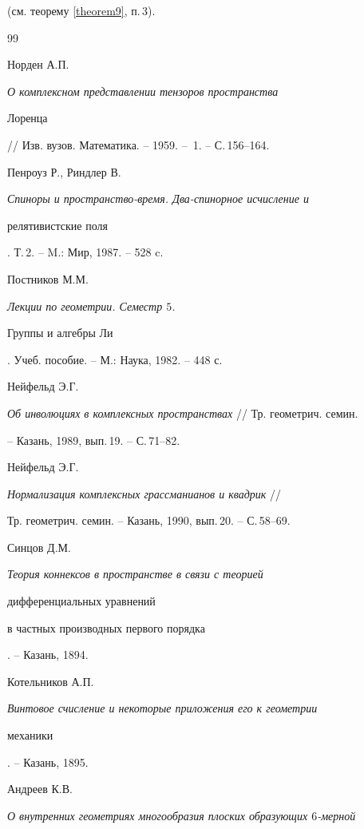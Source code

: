 (см. теорему \ref{theorem9}, п.\,3).





\begin{thebibliography}{99}







Норден А.П. {\em О комплексном представлении тензоров пространства


Лоренца} // Изв. вузов. Математика. -- 1959. -- \No\,1. -- С.\,156--164.




Пенроуз Р., Риндлер В.


{\em Спиноры и пространство-время. Два-спинорное исчисление и


релятивистские поля}. Т.\,2. -- M.: Мир, 1987. -- 528 c.




Постников М.М. {\em Лекции по геометрии. Семестр $5$.


Группы и алгебры Ли}. Учеб. пособие. -- М.: Наука, 1982. -- 448 с.




Нейфельд Э.Г.


{\em Об инволюциях в комплексных пространствах} // Тр. геометрич. семин.


-- Казань, 1989, вып.\,19. -- С.\,71--82.




Нейфельд Э.Г.


{\em Нормализация комплексных грассманианов и квадрик} //


Тр. геометрич. семин. -- Казань, 1990, вып.\,20. -- С.\,58--69.




Синцов Д.М. {\em Теория коннексов в пространстве в связи с теорией 


дифференциальных уравнений


в частных производных первого порядка}. -- Казань, 1894.




Котельников А.П.


{\em Винтовое счисление и некоторые приложения его к геометрии


механики}. -- Казань, 1895.




Андреев К.В.


{\em О внутренних геометриях многообразия плоских образующих $6$-мерной


}
\end{thebibliography}
